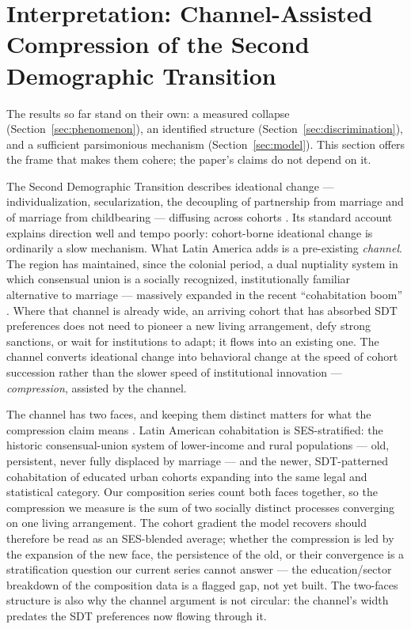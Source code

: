 \section{Interpretation: Channel-Assisted Compression of the Second
Demographic Transition}
\label{sec:interpretation}

The results so far stand on their own: a measured collapse
(Section~\ref{sec:phenomenon}), an identified structure
(Section~\ref{sec:discrimination}), and a sufficient parsimonious mechanism
(Section~\ref{sec:model}). This section offers the frame that makes them
cohere; the paper's claims do not depend on it.

The Second Demographic Transition describes ideational change ---
individualization, secularization, the decoupling of partnership from marriage
and of marriage from childbearing --- diffusing across cohorts
\citep{lesthaeghe1986twee, vandekaa1987, lesthaeghe2010}. Its standard account
explains direction well and tempo poorly: cohort-borne ideational change is
ordinarily a slow mechanism. What Latin America adds is a pre-existing
\emph{channel}. The region has maintained, since the colonial period, a dual
nuptiality system in which consensual union is a socially recognized,
institutionally familiar alternative to marriage --- massively expanded in the
recent ``cohabitation boom'' \citep{esteve2012}. Where that channel is already
wide, an arriving cohort that has absorbed SDT preferences does not need to
pioneer a new living arrangement, defy strong sanctions, or wait for
institutions to adapt; it flows into an existing one. The channel converts
ideational change into behavioral change at the speed of cohort succession
rather than the slower speed of institutional innovation --- \emph{compression},
assisted by the channel.

The channel has two faces, and keeping them distinct matters for what the
compression claim means \citep{esteve2012}. Latin American cohabitation is
SES-stratified: the historic consensual-union system of lower-income and rural
populations --- old, persistent, never fully displaced by marriage --- and the
newer, SDT-patterned cohabitation of educated urban cohorts expanding into the
same legal and statistical category. Our composition series count both faces
together, so the compression we measure is the sum of two socially distinct
processes converging on one living arrangement. The cohort gradient the model
recovers should therefore be read as an SES-blended average; whether the
compression is led by the expansion of the new face, the persistence of the
old, or their convergence is a stratification question our current series
cannot answer --- the education/sector breakdown of the composition data is a
flagged gap, not yet built. The two-faces structure is also why the channel
argument is not circular: the channel's width predates the SDT preferences now
flowing through it.

